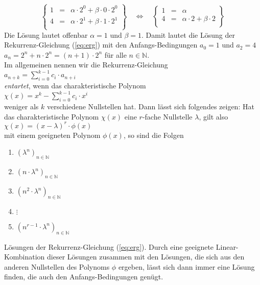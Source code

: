 \[
\left\{
\begin{array}{lcl}
  1 & = & \alpha \cdot 2^0 + \beta \cdot 0 \cdot 2^0 \\
  4 & = & \alpha \cdot 2^1 + \beta \cdot 1 \cdot 2^1 \\
\end{array}
\right\} \quad\Leftrightarrow\quad \left\{
\begin{array}{lcl}
  1 & = & \alpha \\
  4 & = & \alpha \cdot 2 + \beta \cdot 2 \\
\end{array}
\right\}\]
Die Lösung lautet offenbar $\alpha = 1$ und $\beta = 1$.  Damit lautet die Lösung der
Rekurrenz-Gleichung (\ref{eq:erg}) mit den Anfangs-Bedingungen $a_0 = 1$ und $a_2 = 4$ \\[0.2cm]
\hspace*{1.3cm} $a_n = 2^n + n \cdot 2^n = (n+1) \cdot 2^n$ \quad für alle $n \in \mathbb{N}$.  \\[0.2cm]
Im allgemeinen nennen wir die Rekurrenz-Gleichung \\[0.2cm]
\hspace*{1.3cm} $a_{n+k} = \sum\limits_{i=0}^{k-1} c_{i} \cdot a_{n+i}$ \\[0.2cm]
\emph{entartet}, wenn das charakteristische Polynom \\[0.2cm]
\hspace*{1.3cm} $\chi(x) = x^k - \sum\limits_{i=0}^{k-1} c_{i} \cdot x^{i}$  \\[0.2cm]
weniger als $k$ verschiedene Nullstellen hat.  Dann lässt sich folgendes
zeigen:  Hat das charakteristische Polynom $\chi(x)$ eine $r$-fache Nullstelle
$\lambda$, gilt also \\[0.2cm]
\hspace*{1.3cm} $\chi(x) = (x - \lambda)^r \cdot \phi(x)$ \\[0.2cm]
mit einem geeigneten Polynom $\phi(x)$, so sind die Folgen
\begin{enumerate}
\item $(\lambda^n)_{n\in\mathbb{N}}$
\item $(n\cdot\lambda^n)_{n\in\mathbb{N}}$
\item $(n^2\cdot\lambda^n)_{n\in\mathbb{N}}$
\item $\vdots$
\item $(n^{r-1}\cdot\lambda^n)_{n\in\mathbb{N}}$
\end{enumerate}
Lösungen der Rekurrenz-Gleichung (\ref{eq:erg}).  Durch eine geeignete Linear-Kombination dieser
Lösungen zusammen mit den Lösungen, die sich aus den anderen Nullstellen des Polynoms $\phi$
ergeben, lässt sich dann immer eine Lösung finden, die auch den Anfangs-Bedingungen genügt.
\vspace*{0.3cm}

